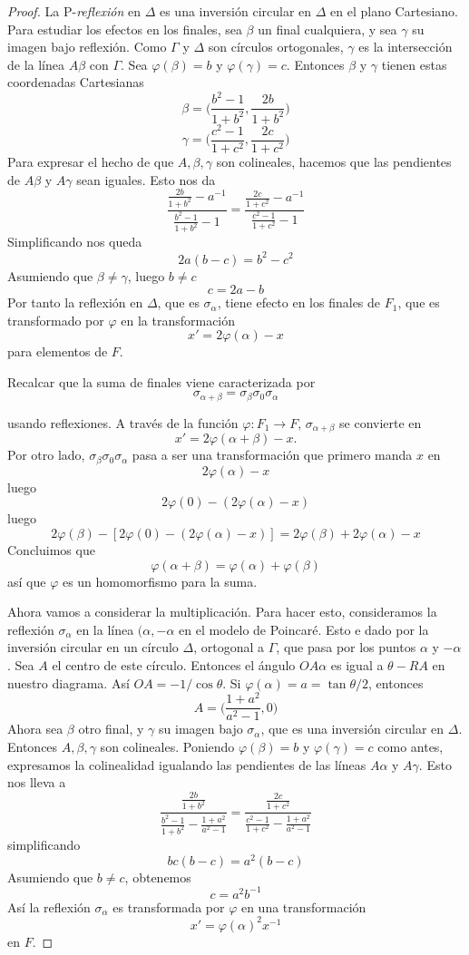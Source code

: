 \documentclass[a4paper]{amsart}
\theoremstyle{plain}
\begin{document}
\begin{proof}
La P-\textit{reflexión} en $\Delta$ es una inversión circular en $\Delta$ en el plano Cartesiano. Para estudiar los efectos en los finales, sea $\beta$ un final cualquiera, y sea $\gamma$ su imagen bajo reflexión. Como $\Gamma$ y $\Delta$ son círculos ortogonales, $\gamma$ es la intersección de la línea $A\beta$ con $\Gamma$. Sea $\varphi(\beta)=b$ y $\varphi(\gamma)=c$. Entonces $\beta$ y $\gamma$ tienen estas coordenadas Cartesianas
\[
\beta=\Big(\frac{b^2-1}{1+b^2},\frac{2b}{1+b^2}\Big)
\]
\[
\gamma=\Big(\frac{c^2-1}{1+c^2},\frac{2c}{1+c^2}\Big)
\]
Para expresar el hecho de que $A,\beta,\gamma$ son colineales, hacemos que las pendientes de $A\beta$ y $A\gamma$ sean iguales. Esto nos da
\[
\frac{\frac{2b}{1+b^2}-a^{-1}}{\frac{b^2-1}{1+b^2}-1}=
\frac{\frac{2c}{1+c^2}-a^{-1}}{\frac{c^2-1}{1+c^2}-1}
\]
Simplificando nos queda
\[
2a(b-c)=b^2-c^2
\]
Asumiendo que $\beta\neq\gamma$, luego $b\neq c$
\[
c=2a-b
\]
Por tanto la reflexión en $\Delta$, que es $\sigma_\alpha$, tiene efecto en los finales de $F_1$, que es transformado por $\varphi$ en la transformación
\[
x'=2\varphi(\alpha)-x
\]
para elementos de $F$.

Recalcar que la suma de finales viene caracterizada por
\[
\sigma_{\alpha+\beta}=\sigma_\beta\sigma_0\sigma_\alpha
\]

usando reflexiones. A través de la función $\varphi:F_1\rightarrow F$, $\sigma_{\alpha+\beta}$ se convierte en
\[
x'=2\varphi(\alpha+\beta)-x.
\]
Por otro lado, $\sigma_\beta\sigma_0\sigma_\alpha$ pasa a ser una transformación que primero manda $x$ en 
\[
2\varphi(\alpha)-x
\]
luego
\[
2\varphi(0)-(2\varphi(\alpha)-x)
\]
luego
\[
2\varphi(\beta)-[2\varphi(0)-(2\varphi(\alpha)-x)]=2\varphi(\beta)+2\varphi(\alpha)-x
\]
Concluimos que
\[
\varphi(\alpha+\beta)=\varphi(\alpha)+\varphi(\beta)
\]
así que $\varphi$ es un homomorfismo para la suma.

Ahora vamos a considerar la multiplicación. Para hacer esto, consideramos la reflexión $\sigma_\alpha$ en la línea $(\alpha,-\alpha$ en el modelo de Poincaré. Esto e dado por la inversión circular en un círculo $\Delta$, ortogonal a $\Gamma$, que pasa por los puntos $\alpha$ y $-\alpha$. Sea $A$ el centro de este círculo. Entonces el ángulo $OA\alpha$ es igual a $\theta-RA$ en nuestro diagrama. Así $OA=-1/\cos\theta$. Si $\varphi(\alpha)=a=\tan\theta/2$, entonces
\[
A=\Big(\frac{1+a^2}{a^2-1},0\Big)
\]
Ahora sea $\beta$ otro final, y $\gamma$ su imagen bajo $\sigma_\alpha$, que es una inversión circular en $\Delta$. Entonces $A,\beta,\gamma$ son colineales. Poniendo $\varphi(\beta)=b$ y $\varphi(\gamma)=c$ como antes, expresamos la colinealidad igualando las pendientes de las líneas $A\alpha$ y $A\gamma$. Esto nos lleva a
\[
\frac{\frac{2b}{1+b^2}}{\frac{b^2-1}{1+b^2}-\frac{1+a^2}{a^2-1}}=
\frac{\frac{2c}{1+c^2}}{\frac{c^2-1}{1+c^2}-\frac{1+a^2}{a^2-1}}
\]
simplificando
\[
bc(b-c)=a^2(b-c)
\]
Asumiendo que $b\neq c$, obtenemos
\[
c=a^2b^{-1}
\]
Así la reflexión $\sigma_\alpha$ es transformada por $\varphi$ en una transformación
\[
x'=\varphi(\alpha)^2x^{-1}
\]
en $F$.


\end{proof}
\end{document}
